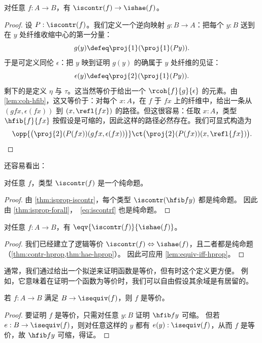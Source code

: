 \begin{thm}\label{thm:lequiv-contr-hae}
对任意 $f:A\to B$，有 ${\iscontr(f)} \to {\ishae(f)}$。
\end{thm}
\begin{proof}
设 $P : \iscontr(f)$。我们定义一个逆向映射 $g : B \to A$：把每个 $y : B$ 送到在 $y$ 处纤维收缩中心的第一分量：
\[ g(y) \defeq \proj{1}(\proj{1}(Py)). \]
于是可定义同伦 $\epsilon$：把 $y$ 映到证明 $g(y)$ 的确属于 $y$ 处纤维的见证：
\[ \epsilon(y) \defeq \proj{2}(\proj{1}(P y)). \]
剩下的是定义 $\eta$ 与 $\tau$。这当然等价于给出一个 $\rcoh{f}{g}{\epsilon}$ 的元素。由 \cref{lem:coh-hfib}，这又等价于：对每个 $x:A$，在 $f$ 于 $fx$ 上的纤维中，给出一条从 $(gfx,\epsilon(fx))$ 到 $(x,\refl{fx})$ 的路径。但这很容易：任取 $x : A$，类型 $\hfib{f}{fx}$
按假设是可缩的，因此这样的路径必然存在。我们可显式构造为
\[\opp{\big(\proj{2}(P(fx))(gfx,\epsilon(fx))\big)} \ct \big(\proj{2}(P(fx)) (x,\refl{fx})\big). \qedhere \]
\end{proof}

还容易看出：

\begin{lem}\label{thm:contr-hprop}
  对任意 $f$，类型 $\iscontr(f)$ 是一个纯命题。
\end{lem}
\begin{proof}
  由 \cref{thm:isprop-iscontr}，每个类型 $\iscontr (\hfib f y)$ 都是纯命题。
  因此由 \cref{thm:isprop-forall}，~\eqref{eq:iscontrf} 也是纯命题。
\end{proof}

\begin{thm}\label{thm:equiv-contr-hae}
  对任意 $f:A\to B$，有 $\eqv{\iscontr(f)}{\ishae(f)}$。
\end{thm}
\begin{proof}
  我们已经建立了逻辑等价 ${\iscontr(f)} \Leftrightarrow {\ishae(f)}$，且二者都是纯命题（\cref{thm:contr-hprop,thm:hae-hprop}）。
  因此可应用 \cref{lem:equiv-iff-hprop}。
\end{proof}

通常，我们通过给出一个拟逆来证明函数是等价，但有时这个定义更方便。
例如，它意味着在证明一个函数为等价时，我们可以自由假设其余域是有居留的。

\begin{cor}\label{thm:equiv-inhabcod}
  若 $f:A\to B$ 满足 $B\to \isequiv(f)$，则 $f$ 是等价。
\end{cor}
\begin{proof}
  要证明 $f$ 是等价，只需对任意 $y:B$ 证明 $\hfib f y$ 可缩。
  但若 $e:B\to \isequiv(f)$，则对任意这样的 $y$ 都有 $e(y):\isequiv(f)$，从而 $f$ 是等价，故 $\hfib f y$ 可缩，得证。
\end{proof}

